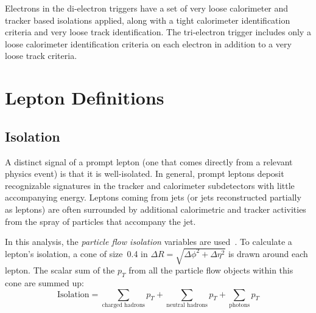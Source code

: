 Electrons in the di-electron triggers have a set of very loose calorimeter and
tracker based isolations applied, along with a tight calorimeter identification
criteria and very loose track identification. The tri-electron trigger includes
only a loose calorimeter identification criteria on each electron in addition to
a very loose track criteria.

\section{Lepton Definitions}

\label{sec:leptons}
\subsection{Isolation}
A distinct signal of a prompt lepton (one that comes directly from a relevant
physics event) is that it is well-isolated. In general, prompt leptons deposit
recognizable signatures in the tracker and calorimeter subdetectors with little
accompanying energy. Leptons coming from jets (or jets reconstructed partially
as leptons) are often surrounded by additional calorimetric and tracker
activities from the spray of particles that accompany the jet.

In this analysis, the \emph{particle flow isolation} variables are
used~\cite{pflow}. To calculate a lepton's isolation, a cone of size~0.4 in
$\Delta R = \sqrt{\Delta\phi^2+\Delta\eta^2}$ is drawn around each lepton. The scalar sum of the $p_T$ from all the
particle flow objects within this cone are summed up:
\begin{equation}
\label{eqn:PU}
    \textrm{Isolation} = \sum_{\textrm{charged hadrons}} p_T + \sum_{\textrm{neutral
    hadrons}}  p_T + \sum_{\textrm{photons}} p_T
\end{equation}


